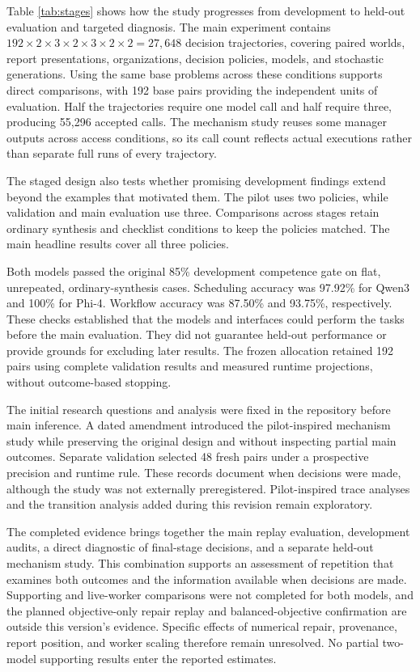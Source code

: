 \documentclass{svproc}
\begin{document}
Table \ref{tab:stages} shows how the study progresses from development to
held-out evaluation and targeted diagnosis. The main experiment contains
$192\times2\times3\times2\times3\times2\times2=27{,}648$ decision trajectories,
covering paired worlds, report presentations, organizations, decision policies,
models, and stochastic generations. Using the same base problems across these
conditions supports direct comparisons, with 192 base pairs providing the
independent units of evaluation. Half the trajectories require one model call
and half require three, producing 55,296 accepted calls. The mechanism study
reuses some manager outputs across access conditions, so its call count reflects
actual executions rather than separate full runs of every trajectory.

The staged design also tests whether promising development findings extend
beyond the examples that motivated them. The pilot uses two policies, while
validation and main evaluation use three. Comparisons across stages retain
ordinary synthesis and checklist conditions to keep the policies matched.
The main headline results cover all three policies.

Both models passed the original 85\% development competence gate on flat,
unrepeated, ordinary-synthesis cases. Scheduling accuracy was 97.92\% for Qwen3
and 100\% for Phi-4. Workflow accuracy was 87.50\% and 93.75\%, respectively.
These checks established that the models and interfaces could perform the tasks
before the main evaluation. They did not guarantee held-out performance or
provide grounds for excluding later results. The frozen allocation retained
192 pairs using complete validation results and measured runtime projections,
without outcome-based stopping.

The initial research questions and analysis were fixed in the repository before
main inference. A dated amendment introduced the pilot-inspired mechanism study
while preserving the original design and without inspecting partial main
outcomes. Separate validation selected 48 fresh pairs under a prospective
precision and runtime rule. These records document when decisions were made,
although the study was not externally preregistered. Pilot-inspired trace
analyses and the transition analysis added during this revision remain
exploratory.

The completed evidence brings together the main replay evaluation, development
audits, a direct diagnostic of final-stage decisions, and a separate held-out
mechanism study. This combination supports an assessment of repetition that
examines both outcomes and the information available when decisions are made.
Supporting and live-worker comparisons were not completed for both models,
and the planned objective-only repair replay and balanced-objective confirmation
are outside this version's evidence. Specific effects of numerical repair,
provenance, report position, and worker scaling therefore remain unresolved.
No partial two-model supporting results enter the reported estimates.
\end{document}
